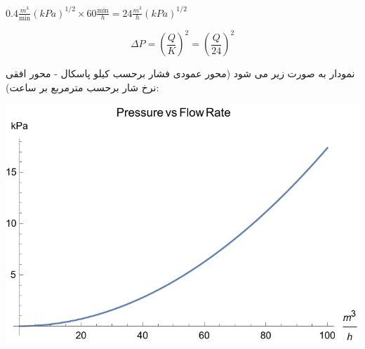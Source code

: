\documentclass[12pt]{article}
\begin{document}
$0.4 \frac{m^3}{\text{min}} (kPa)^{1/2} \times 60 \frac{\text{min}}{h} = 24 \frac{m^3}{h} (kPa)^{1/2}$

$$\Delta P = (\frac{Q}{K})^2 = (\frac{Q}{24})^2$$


نمودار به صورت زیر می شود (محور عمودی فشار برحسب کیلو پاسکال - محور افقی نرخ شار برحسب مترمربع بر ساعت):


\begin{center}
	\includegraphics[width = 1.0 \textwidth]{images/8.pdf}
\end{center}
\end{document}
